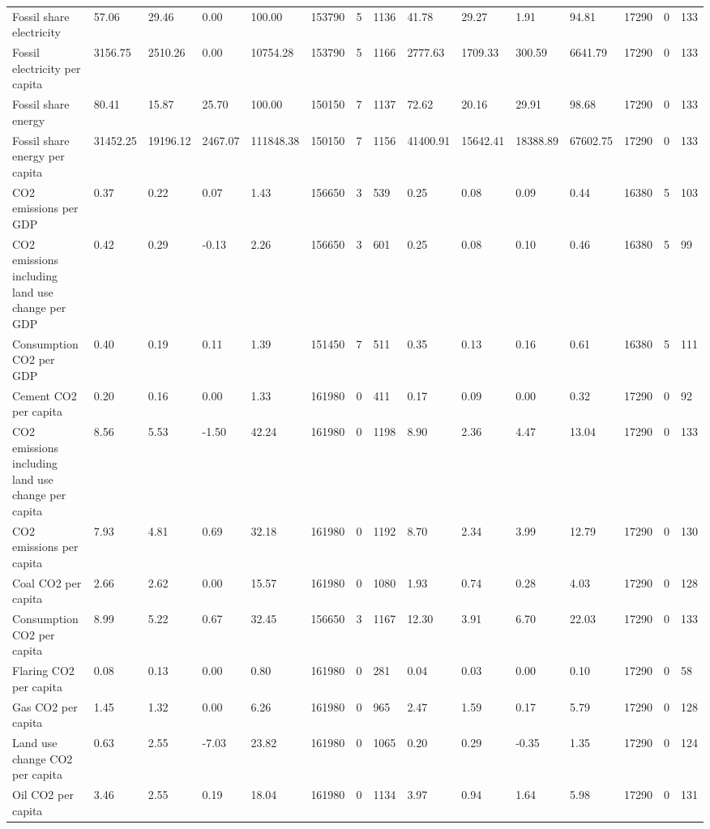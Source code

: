 \begin{longtable}{lllllllllllllll}
Fossil share electricity & 57.06 & 29.46 & 0.00 & 100.00 & 153790 & 5 & 1136 & 41.78 & 29.27 & 1.91 & 94.81 & 17290 & 0 & 133\\
\addlinespace
Fossil electricity per capita & 3156.75 & 2510.26 & 0.00 & 10754.28 & 153790 & 5 & 1166 & 2777.63 & 1709.33 & 300.59 & 6641.79 & 17290 & 0 & 133\\
Fossil share energy & 80.41 & 15.87 & 25.70 & 100.00 & 150150 & 7 & 1137 & 72.62 & 20.16 & 29.91 & 98.68 & 17290 & 0 & 133\\
Fossil share energy per capita & 31452.25 & 19196.12 & 2467.07 & 111848.38 & 150150 & 7 & 1156 & 41400.91 & 15642.41 & 18388.89 & 67602.75 & 17290 & 0 & 133\\
CO2 emissions per GDP & 0.37 & 0.22 & 0.07 & 1.43 & 156650 & 3 & 539 & 0.25 & 0.08 & 0.09 & 0.44 & 16380 & 5 & 103\\
CO2 emissions including land use change per GDP & 0.42 & 0.29 & -0.13 & 2.26 & 156650 & 3 & 601 & 0.25 & 0.08 & 0.10 & 0.46 & 16380 & 5 & 99\\
\addlinespace
Consumption CO2 per GDP & 0.40 & 0.19 & 0.11 & 1.39 & 151450 & 7 & 511 & 0.35 & 0.13 & 0.16 & 0.61 & 16380 & 5 & 111\\
Cement CO2 per capita & 0.20 & 0.16 & 0.00 & 1.33 & 161980 & 0 & 411 & 0.17 & 0.09 & 0.00 & 0.32 & 17290 & 0 & 92\\
CO2 emissions including land use change per capita & 8.56 & 5.53 & -1.50 & 42.24 & 161980 & 0 & 1198 & 8.90 & 2.36 & 4.47 & 13.04 & 17290 & 0 & 133\\
CO2 emissions per capita & 7.93 & 4.81 & 0.69 & 32.18 & 161980 & 0 & 1192 & 8.70 & 2.34 & 3.99 & 12.79 & 17290 & 0 & 130\\
Coal CO2 per capita & 2.66 & 2.62 & 0.00 & 15.57 & 161980 & 0 & 1080 & 1.93 & 0.74 & 0.28 & 4.03 & 17290 & 0 & 128\\
\addlinespace
Consumption CO2 per capita & 8.99 & 5.22 & 0.67 & 32.45 & 156650 & 3 & 1167 & 12.30 & 3.91 & 6.70 & 22.03 & 17290 & 0 & 133\\
Flaring CO2 per capita & 0.08 & 0.13 & 0.00 & 0.80 & 161980 & 0 & 281 & 0.04 & 0.03 & 0.00 & 0.10 & 17290 & 0 & 58\\
Gas CO2 per capita & 1.45 & 1.32 & 0.00 & 6.26 & 161980 & 0 & 965 & 2.47 & 1.59 & 0.17 & 5.79 & 17290 & 0 & 128\\
Land use change CO2 per capita & 0.63 & 2.55 & -7.03 & 23.82 & 161980 & 0 & 1065 & 0.20 & 0.29 & -0.35 & 1.35 & 17290 & 0 & 124\\
Oil CO2 per capita & 3.46 & 2.55 & 0.19 & 18.04 & 161980 & 0 & 1134 & 3.97 & 0.94 & 1.64 & 5.98 & 17290 & 0 & 131\\

\end{longtable}
